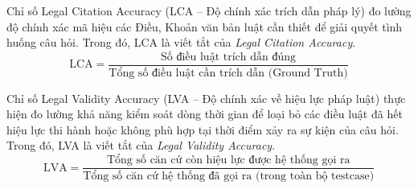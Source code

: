 \documentclass[../DoAn.tex]{subfiles}
\begin{document}
Chỉ số Legal Citation Accuracy (LCA -- Độ chính xác trích dẫn pháp lý) đo lường độ chính xác mã hiệu các Điều, Khoản văn bản luật cần thiết để giải quyết tình huống câu hỏi. Trong đó, LCA là viết tắt của \textit{Legal Citation Accuracy}.
\begin{equation}
\label{eq:lca_metric}
\text{LCA} = \frac{\text{Số điều luật trích dẫn đúng}}{\text{Tổng số điều luật cần trích dẫn (Ground Truth)}}
\end{equation}

Chỉ số Legal Validity Accuracy (LVA -- Độ chính xác về hiệu lực pháp luật) thực hiện đo lường khả năng kiểm soát dòng thời gian để loại bỏ các điều luật đã hết hiệu lực thi hành hoặc không phù hợp tại thời điểm xảy ra sự kiện của câu hỏi. Trong đó, LVA là viết tắt của \textit{Legal Validity Accuracy}.
\begin{equation}
\label{eq:lva_metric}
\text{LVA} = \frac{\text{Tổng số căn cứ còn hiệu lực được hệ thống gọi ra}}{\text{Tổng số căn cứ hệ thống đã gọi ra (trong toàn bộ testcase)}}
\end{equation}



\end{document}
